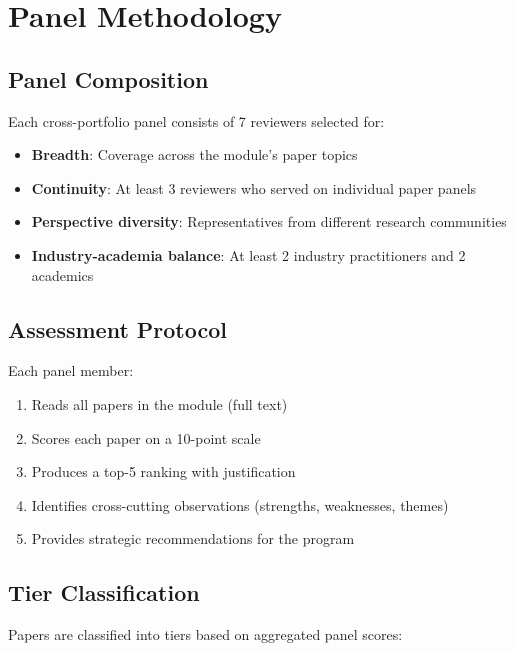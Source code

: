 \section{Panel Methodology}

\subsection{Panel Composition}

Each cross-portfolio panel consists of 7 reviewers selected for:
\begin{itemize}
    \item \textbf{Breadth}: Coverage across the module's paper topics
    \item \textbf{Continuity}: At least 3 reviewers who served on individual paper panels
    \item \textbf{Perspective diversity}: Representatives from different research communities
    \item \textbf{Industry-academia balance}: At least 2 industry practitioners and 2 academics
\end{itemize}

\subsection{Assessment Protocol}

Each panel member:
\begin{enumerate}
    \item Reads all papers in the module (full text)
    \item Scores each paper on a 10-point scale
    \item Produces a top-5 ranking with justification
    \item Identifies cross-cutting observations (strengths, weaknesses, themes)
    \item Provides strategic recommendations for the program
\end{enumerate}

\subsection{Tier Classification}

Papers are classified into tiers based on aggregated panel scores:

